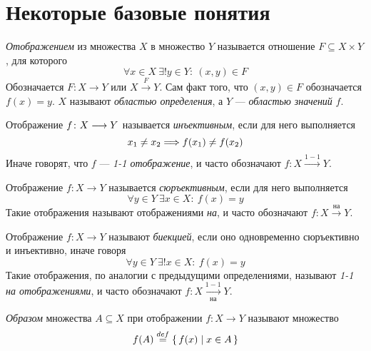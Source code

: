 
\section{Некоторые базовые понятия}

\begin{definition}
    \textit{Отображением} из множества $X$ в множество $Y$ называется
    отношение $F \subseteq X \times Y$, для которого
\[
    \forall x \in X~\exists! y \in Y \colon ~(x, y) \in F
\]
Обозначается $F \colon X \to Y$ или $X \xrightarrow{F} Y$. Сам факт того, что $(x, y) \in F$ обозначается $f(x) = y$. $X$ называют \textit{областью определения}, а $Y$ --- \textit{областью значений} $f$.
\end{definition}

\begin{definition}
    Отображение $f \colon X \longrightarrow Y$ называется \textit{инъективным}, если для него выполняется
\[
    x_1 \neq x_2 \Longrightarrow f(x_1) \neq f(x_2)
\]
Иначе говорят, что $f$ --- \textit{1-1 отображение}, и часто обозначают
$f \colon X \xrightarrow{1-1} Y$.
\end{definition}

\begin{definition}
    Отображение $f \colon X \to Y$ называется \textit{сюръективным}, если для него выполняется
\[
    \forall y \in Y~ \exists x \in X \colon~ f(x) = y
\]
Такие отображения называют отображениями \textit{на}, и часто обозначают
$f \colon X \xrightarrow{\text{на}} Y$.

\end{definition}

\begin{definition}
    Отображение $f \colon X \to Y$ называют \textit{биекцией}, если оно одновременно сюръективно и инъективно, иначе говоря
\[
    \forall y \in Y~ \exists! x \in X \colon~ f(x) = y
\]
Такие отображения, по аналогии с предыдущими определениями,
называют \textit{1-1 на отображениями}, и часто обозначают
$f \colon X \xrightarrow[\text{на}]{1-1} Y$.
\end{definition}

\begin{definition}
    \textit{Образом} множества $A \subseteq X$ при отображении $f \colon X \to Y$
    называют множество
\[
    f(A) \overset{def}{\underset{}{=}} \{\, f(x) \mid x \in A \,\}
\]
\end{definition}

